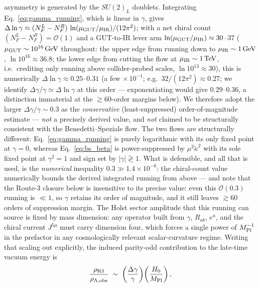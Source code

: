 \documentclass[aps,prd,twocolumn,superscriptaddress,showpacs,preprintnumbers,nofootinbib,longbibliography,floatfix]{revtex4-2}
\begin{document}
asymmetry is generated by the $SU(2)_L$ doublets. Integrating
Eq.~\eqref{eq:gamma_running}, which is linear in $\gamma$, gives
$\Delta\ln\gamma \approx (N_F^L-N_F^R)\,
\ln(\mu_{\rm GUT}/\mu_{\rm IR})/(12\pi^2)$; with a net chiral count
$(N_F^L-N_F^R)=\mathcal{O}(1)$ and a GUT-to-IR lever arm
$\ln(\mu_{\rm GUT}/\mu_{\rm IR})\approx 30$--$37$
($\mu_{\rm GUT}\sim 10^{16}\,\text{GeV}$ throughout: the upper edge from
running down to $\mu_{\rm IR}\sim 1\,\text{GeV}$, $\ln 10^{16}\approx
36.8$; the lower edge from cutting the flow at $\mu_{\rm IR}\sim
1\,\text{TeV}$, i.e.\ crediting only running above collider-probed
scales, $\ln 10^{13}\approx 30$),
this is numerically $\Delta\ln\gamma \approx 0.25$--$0.31$
(a few$\,\times 10^{-1}$; e.g.\ $32/(12\pi^2)\approx 0.27$; we
identify $\Delta\gamma/\gamma \simeq \Delta\ln\gamma$ at this order
--- exponentiating would give $0.29$--$0.36$, a distinction immaterial
at the $\gtrsim 60$-order margins below).
We therefore adopt the larger $\Delta\gamma/\gamma \sim 0.3$ as the
\emph{conservative} (least-suppressed) order-of-magnitude estimate ---
\emph{not} a precisely derived value, and \emph{not} claimed to be
structurally consistent with the Benedetti--Speziale flow. The two flows
are structurally different: Eq.~\eqref{eq:gamma_running} is purely
logarithmic with its only fixed point at $\gamma=0$, whereas
Eq.~\eqref{eq:bs_beta} is power-suppressed by $\mu^2\tilde\kappa^2$ with
its sole fixed point at $\gamma^2=1$ and sign set by
$|\gamma|\gtrless 1$. What is defensible, and all that is used, is the
\emph{numerical} inequality $0.3\gg1.4\times10^{-6}$: the chiral-count
value numerically bounds the derived integrated running from above ---
and note that the Route-3
closure below is insensitive to its precise value: even this
$\mathcal{O}(0.3)$ running is $\ll 1$, so $\gamma$ retains its order of
magnitude, and it still leaves $\gtrsim 60$ orders of suppression margin. The Holst sector amplitude that this running can source is
fixed by mass dimension: any operator built from
$\gamma$, $R_{ab}$, $e^a$, and the chiral current $J^{5\mu}$ must carry
dimension four, which forces a single power of $M_{\rm Pl}^{-1}$ in
the prefactor in any cosmologically relevant scalar-curvature regime.
Writing that scaling out explicitly, the induced parity-odd contribution
to the late-time vacuum energy is
\begin{equation}\label{eq:r3_density}
\frac{\rho_{\rm R3}}{\rho_{\Lambda,\rm obs}}
\;\sim\;\left(\frac{\Delta\gamma}{\gamma}\right)\!\left(\frac{H_0}{M_{\rm Pl}}\right),
\end{equation}
\end{document}
